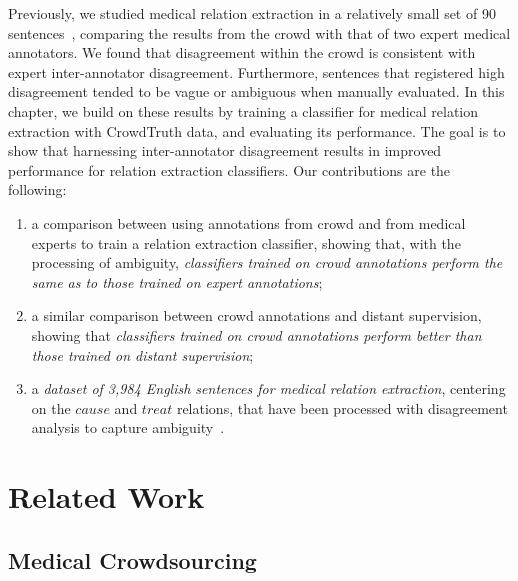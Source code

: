 Previously, we studied medical relation extraction in a relatively small set of 90 sentences~\cite{aroyo2013measuring}, comparing the results from the crowd with that of two expert medical annotators. We found that disagreement within the crowd is consistent with expert inter-annotator disagreement. Furthermore, sentences that registered high disagreement tended to be vague or ambiguous when manually evaluated. In this chapter, we build on these results by training a classifier for medical relation extraction with CrowdTruth data, and evaluating its performance. The goal is to show that harnessing inter-annotator disagreement results in improved performance for relation extraction classifiers. Our contributions are the following:

\begin{enumerate}

\item a comparison between using annotations from crowd and from medical experts to train a relation extraction classifier, showing that, with the processing of ambiguity, \textit{classifiers trained on crowd annotations perform the same as to those trained on expert annotations};

\item a similar comparison between crowd annotations and distant supervision, showing that \textit{classifiers trained on crowd annotations perform better than those trained on distant supervision};

\item a \textit{dataset of 3,984 English sentences for medical relation extraction}, centering on the $cause$ and $treat$ relations, that have been processed with disagreement analysis to capture ambiguity~\cite{anca_dumitrache_2016_50676}.

\end{enumerate}


\section{Related Work}

\subsection{Medical Crowdsourcing}

